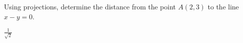
\begin{Exercise}[
name={},
title={}, 
difficulty=0,
origin={\cite{MB}}]
Using projections, determine the distance from the point $A(2,3)$ to the line $x-y=0$.

\end{Exercise}
\begin{Answer}
$\frac{1}{\sqrt{2}}$
\end{Answer}
